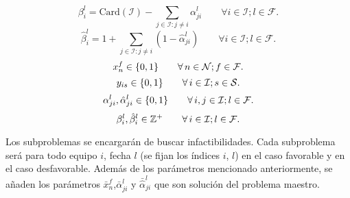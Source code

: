 \documentclass[authoryear,preprint,review,12pts]{elsarticle}
\begin{document}
\begin{equation}\label{ecua13}
   \beta_{i}^l = \text{Card$(\mathcal{I})$} - \sum_{j\in \mathcal{I}: j \neq i} \alpha_{ji}^l \qquad \forall i \in \mathcal{I}; l \in \mathcal{F}.
\end{equation}
\begin{equation}\label{ecua14}
   \hat{\beta}_{i}^l = 1 + \sum_{j\in \mathcal{I}: j \neq i} (1-\hat{\alpha}_{ji}^l) \qquad \forall i \in \mathcal{I}; l \in \mathcal{F}.
\end{equation}
\begin{equation}\label{ecua29}
  x_n^f \in\{0,1\} \qquad \forall\, n \in \mathcal{N}; f \in \mathcal{F}.\\
\end{equation}
\begin{equation}\label{ecua30}
  y_{is} \in\{0,1\} \qquad \forall\, i \in \mathcal{I}; s \in \mathcal{S}.\\
\end{equation}
\begin{equation}\label{ecua33}
  \alpha_{ji}^l, \hat{\alpha}_{ji}^l \in \{0,1\} \qquad \forall\, i,j \in \mathcal{I}; l \in \mathcal{F}.\\
\end{equation}
\begin{equation}\label{ecua34}
  \beta_{i}^l, \hat{\beta}_{i}^l \in \mathbb{Z}^+ \qquad \forall\, i \in \mathcal{I}; l \in \mathcal{F}.\\
\end{equation}

Los subproblemas se encargarán de buscar infactibilidades.  Cada subproblema será para todo equipo $i$,  fecha $l$ (se fijan los índices $i$, $l$) en el caso favorable y en el caso desfavorable.  Además de los parámetros mencionado anteriormente,  se añaden los parámetros $\bar{x}_n^f$,$\bar{\alpha}_{ji}^l$ y $\bar{\hat{\alpha}}_{ji}^l$ que son solución del problema maestro.
\end{document}
